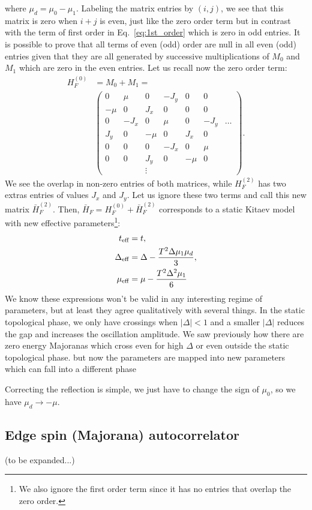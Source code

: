 \documentclass[11pt]{report}
\newcommand{\eff}{_{\textnormal{eff}}}
\begin{document}
% 
where $\mu_d = \mu_0 - \mu_1 $. Labeling the matrix entries by $(i,j)$, we see that this matrix is zero when $i+j$ is even, just like the zero order term but in contrast with the term of first order in Eq.~\ref{eq:1st_order} which is zero in odd entries. It is possible to prove that all terms of even (odd) order are null in all even (odd) entries given that they are all generated by successive multiplications of $M_0$ and $M_1$ which are zero in the even entries. Let us recall now the zero order term:
%
\begin{equation}
\begin{split}
 H_F^{(0)}& = M_0+M_1 =\\
		&\left(\begin{matrix}
		0 & \mu & 0 & -J_y & 0 & 0 \\
		-\mu & 0 & J_x & 0 & 0 & 0  \\
		0 & -J_x & 0 & \mu & 0 & -J_y & \dots \\
		J_y & 0 & -\mu & 0 & J_x & 0 \\
		0 & 0 & 0 & -J_x & 0 & \mu \\
		0 & 0 & J_y & 0 & -\mu & 0\\
		 & & \vdots & & & 
	\end{matrix} \right).
\end{split}
\end{equation}	
%
We see the overlap in non-zero entries of both matrices, while $H_F^{(2)}$ has two extras entries of values $J_x$ and $J_y$. Let us ignore these two terms and call this new matrix $\bar{H}_F^{(2)}$. Then, $\bar{H}_F = H_F^{(0)} + \bar{H}_F^{(2)}$ corresponds to a static Kitaev model with new effective parameters\footnote{We also ignore the first order term since it has no entries that overlap the zero order.}:
%
\begin{align}
t\eff &= t, \\
\Delta\eff &= \Delta - \frac{T^2 \Delta \mu_1 \mu_d}{3}, \\
\mu\eff &= \mu - \frac{T^2 \Delta^2 \mu_1}{6}
\end{align}
%
We know these expressions won't be valid in any interesting regime of parameters, but at least they agree qualitatively with several things. In the static topological phase, we only have crossings when $| \Delta | < 1$ and a smaller $| \Delta |$ reduces the gap and increases the oscillation amplitude. We saw previously how there are zero energy Majoranas which cross even for high $\Delta$ or even outside the static topological phase. but now the parameters are mapped into new parameters which can fall into a different phase

Correcting the reflection is simple, we just have to change the sign of $\mu_0$, so we have $\mu_d \rightarrow -\mu$.


\subsection*{Edge spin (Majorana) autocorrelator}
(to be expanded...)



\end{document}

